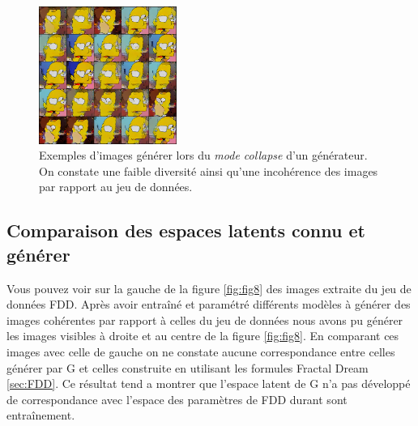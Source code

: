 \documentclass[11pt,francais]{article}
\begin{document}
\begin{figure}[h!]
    \centering
    \includegraphics[width=0.40\textwidth]{Figures/LossG_et_Convergeance/collapse_980.png}
    \caption{Exemples d'images générer lors du \textit{mode collapse} d'un générateur. On constate une faible diversité ainsi qu'une incohérence des images par rapport au jeu de données.}
    \label{fig:fig7}
\end{figure}

\subsection{Comparaison des espaces latents connu et générer}
\label{sec:ComparaisonLS}
Vous pouvez voir sur la gauche de la figure \ref{fig:fig8} des images extraite du jeu de données FDD. Après avoir entraîné et paramétré différents modèles à générer des images cohérentes par rapport à celles du jeu de données nous avons pu générer les images visibles à droite et au centre de la figure \ref{fig:fig8}. 
En comparant ces images avec celle de gauche on ne constate aucune correspondance entre celles générer par G et celles construite en utilisant les formules Fractal Dream \ref{sec:FDD}. 
Ce résultat tend a montrer que l'espace latent de G n'a pas développé de correspondance avec l'espace des paramètres de FDD durant sont entraînement.
\end{document}
